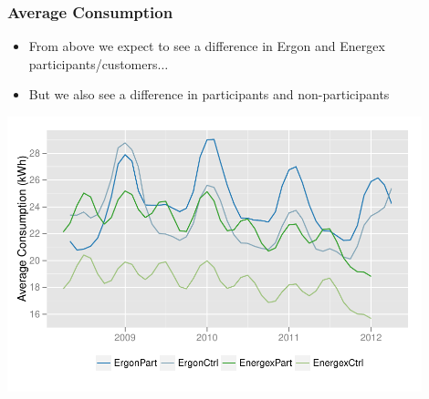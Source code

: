 \documentclass{beamer}
\begin{document}
\begin{frame}
\frametitle{Average Consumption}
\begin{itemize}

\item From above we expect to see a difference in Ergon and Energex
participants/customers$\ldots$

\item But we also see a difference in participants and non-participants

\end{itemize}
\begin{center}
\includegraphics[width=0.9\textwidth]{figures/MeanConsumption}
\end{center}
\end{frame}
\end{document}

